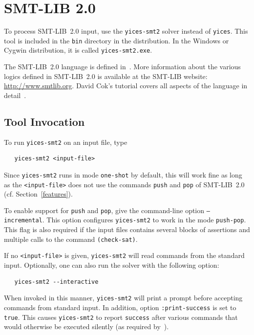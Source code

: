 \documentclass[11pt,twoside,fleqn,openright,titlepage]{cslreport}
\begin{document}
\section{SMT-LIB 2.0}

To process SMT-LIB~2.0 input, use the \texttt{yices-smt2} solver
instead of \texttt{yices}. This tool is included in the \texttt{bin}
directory in the distribution. In the Windows or Cygwin distribution,
it is called \texttt{yices-smt2.exe}.

\medskip\noindent
The SMT-LIB~2.0 language is defined in~\cite{SMTLIB20:2012}. More
information about the various logics defined in SMT-LIB~2.0 is
available at the SMT-LIB website: \url{http://www.smtlib.org}. David Cok's
tutorial covers all aspects of the language in
detail~\cite{SMTLIB:tutorial:2013}.


\subsection{Tool Invocation}

To run \texttt{yices-smt2} on an input file, type
\begin{small}
\begin{verbatim}
   yices-smt2 <input-file>
\end{verbatim}
\end{small}
Since \texttt{yices-smt2} runs in mode \texttt{one-shot} by default,
this will work fine as long as the \texttt{<input-file>} does not use
the commands \texttt{push} and \texttt{pop} of SMT-LIB~2.0
(cf. Section~\ref{features}).

\medskip\noindent To enable support for \texttt{push} and
\texttt{pop}, give the command-line option \texttt{--incremental}.
This option configures \texttt{yices-smt2} to work in the mode
\texttt{push-pop}. This flag is also required if the input files
contains several blocks of assertions and multiple calls to the
command \texttt{(check-sat)}.

\medskip\noindent If no \texttt{<input-file>} is given,
\texttt{yices-smt2} will read commands from the standard
input. Optionally, one can also run the solver with
the following option:
\begin{small}
\begin{verbatim}
   yices-smt2 --interactive
\end{verbatim}
\end{small}
When invoked in this manner, \texttt{yices-smt2} will print a prompt
before accepting commands from standard input. In addition, option
\texttt{:print-success} is set to \texttt{true}. This causes
\texttt{yices-smt2} to report \texttt{success} after various commands
that would otherwise be executed silently (as required
by~\cite{SMTLIB20:2012}).
\end{document}
